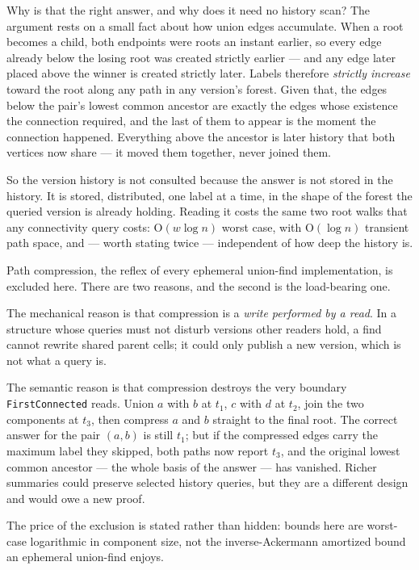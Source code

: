 \documentclass[11pt,twoside,openright]{book}
\newcommand{\code}[1]{\texorpdfstring{\textcolor{d7ink}{\texttt{#1}}}{#1}}
\newcommand{\bigoh}[1]{$\mathrm{O}(#1)$}
\begin{document}
Why is that the right answer, and why does it need no history scan? The argument
rests on a small fact about how union edges accumulate. When a root becomes a
child, both endpoints were roots an instant earlier, so every edge already below
the losing root was created strictly earlier --- and any edge later placed above
the winner is created strictly later. Labels therefore \emph{strictly increase}
toward the root along any path in any version's forest. Given that, the edges
below the pair's lowest common ancestor are exactly the edges whose existence
the connection required, and the last of them to appear is the moment the
connection happened. Everything above the ancestor is later history that both
vertices now share --- it moved them together, never joined them.

So the version history is not consulted because the answer is not stored in the
history. It is stored, distributed, one label at a time, in the shape of the
forest the queried version is already holding. Reading it costs the same two
root walks that any connectivity query costs: \bigoh{w \log n} worst case, with
\bigoh{\log n} transient path space, and --- worth stating twice --- independent
of how deep the history is.

\begin{caveatbox}
Path compression, the reflex of every ephemeral union-find implementation, is
excluded here. There are two reasons, and the second is
the load-bearing one.

The mechanical reason is that compression is a \emph{write performed by a read}.
In a structure whose queries must not disturb versions other readers hold, a
find cannot rewrite shared parent cells; it could only publish a new version,
which is not what a query is.

The semantic reason is that compression destroys the very boundary
\code{FirstConnected} reads. Union $a$ with $b$ at $t_1$, $c$ with $d$ at $t_2$,
join the two components at $t_3$, then compress $a$ and $b$ straight to the
final root. The correct answer for the pair $(a, b)$ is still $t_1$; but if the
compressed edges carry the maximum label they skipped, both paths now report
$t_3$, and the original lowest common ancestor --- the whole basis of the answer
--- has vanished. Richer summaries could preserve selected history queries, but
they are a different design and would owe a new proof.

The price of the exclusion is stated rather than hidden: bounds here are
worst-case logarithmic in component size, not the inverse-Ackermann amortized
bound an ephemeral union-find enjoys.
\end{caveatbox}
\end{document}
